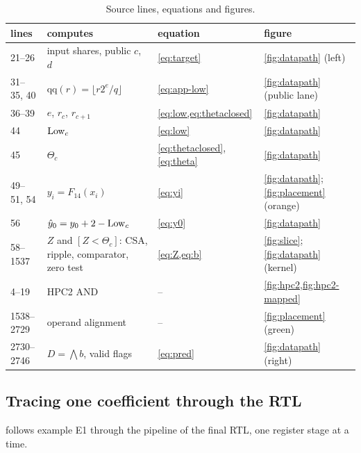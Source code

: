 \begin{table}[h]\centering\small
\caption{Source lines, equations and figures.}\label{tab:v-lines}
\begin{tabularx}{\textwidth}{@{}lXll@{}}
\toprule
lines & computes & equation & figure \\
\midrule
21--26 & input shares, public $c$, $d$ & \cref{eq:target} & \cref{fig:datapath} (left) \\
31--35, 40 & $\mathrm{qq}(r) = \lfloor r 2^e/q \rfloor$ & \cref{eq:app-low} & \cref{fig:datapath} (public lane) \\
36--39 & $e$, $r_c$, $r_{c+1}$ & \cref{eq:low,eq:thetaclosed} & \cref{fig:datapath} \\
44 & $\mathrm{Low}_c$ & \cref{eq:low} & \cref{fig:datapath} \\
45 & $\Theta_c$ & \cref{eq:thetaclosed}, \cref{eq:theta} & \cref{fig:datapath} \\
49--51, 54 & $y_i = F_{14}(x_i)$ & \cref{eq:yi} & \cref{fig:datapath}; \cref{fig:placement} (orange) \\
56 & $\hat y_0 = y_0 + 2 - \mathrm{Low}_c$ & \cref{eq:y0} & \cref{fig:datapath} \\
58--1537 & $Z$ and $[Z < \Theta_c]$: CSA, ripple, comparator, zero test & \cref{eq:Z,eq:b} & \cref{fig:slice}; \cref{fig:datapath} (kernel) \\
4--19 & HPC2 AND & -- & \cref{fig:hpc2,fig:hpc2-mapped} \\
1538--2729 & operand alignment & -- & \cref{fig:placement} (green) \\
2730--2746 & $D = \bigwedge b$, valid flags & \cref{eq:pred} & \cref{fig:datapath} (right) \\
\bottomrule
\end{tabularx}
\end{table}

\subsection{Tracing one coefficient through the RTL}\label{app:v-trace}
 follows example E1 through the pipeline of the final RTL, one register stage at a time.

